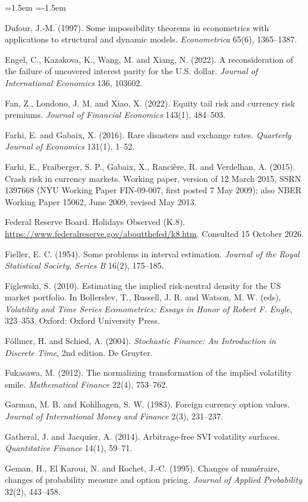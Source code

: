 \documentclass[11pt]{article}
\theoremstyle{result}
\begin{document}
\begin{list}{}{\leftmargin=1.5em \itemindent=-1.5em \itemsep=2pt \parsep=0pt}
\item Dufour, J.-M. (1997). Some impossibility theorems in econometrics with applications to structural and dynamic models. \emph{Econometrica} 65(6), 1365--1387.
\item Engel, C., Kazakova, K., Wang, M. and Xiang, N. (2022). A reconsideration of the failure of uncovered interest parity for the U.S. dollar. \emph{Journal of International Economics} 136, 103602.
\item Fan, Z., Londono, J. M. and Xiao, X. (2022). Equity tail risk and currency risk premiums. \emph{Journal of Financial Economics} 143(1), 484--503.
\item Farhi, E. and Gabaix, X. (2016). Rare disasters and exchange rates. \emph{Quarterly Journal of Economics} 131(1), 1--52.
\item Farhi, E., Fraiberger, S. P., Gabaix, X., Ranci\`ere, R. and Verdelhan, A. (2015). Crash risk in currency markets. Working paper, version of 12 March 2015, SSRN 1397668 (NYU Working Paper FIN-09-007, first posted 7 May 2009); also NBER Working Paper 15062, June 2009, revised May 2013.
\item Federal Reserve Board. Holidays Observed (K.8). \url{https://www.federalreserve.gov/aboutthefed/k8.htm}. Consulted 15 October 2026.
\item Fieller, E. C. (1954). Some problems in interval estimation. \emph{Journal of the Royal Statistical Society, Series B} 16(2), 175--185.
\item Figlewski, S. (2010). Estimating the implied risk-neutral density for the US market portfolio. In Bollerslev, T., Russell, J. R. and Watson, M. W. (eds), \emph{Volatility and Time Series Econometrics: Essays in Honor of Robert F. Engle}, 323--353. Oxford: Oxford University Press.
\item F\"ollmer, H. and Schied, A. (2004). \emph{Stochastic Finance: An Introduction in Discrete Time}, 2nd edition. De Gruyter.
\item Fukasawa, M. (2012). The normalizing transformation of the implied volatility smile. \emph{Mathematical Finance} 22(4), 753--762.
\item Garman, M. B. and Kohlhagen, S. W. (1983). Foreign currency option values. \emph{Journal of International Money and Finance} 2(3), 231--237.
\item Gatheral, J. and Jacquier, A. (2014). Arbitrage-free SVI volatility surfaces. \emph{Quantitative Finance} 14(1), 59--71.
\item Geman, H., El Karoui, N. and Rochet, J.-C. (1995). Changes of num\'eraire, changes of probability measure and option pricing. \emph{Journal of Applied Probability} 32(2), 443--458.

\end{list}
\end{document}
